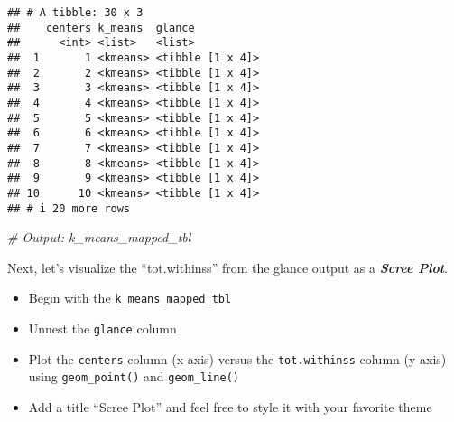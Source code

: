 \documentclass[
]{article}
\newenvironment{Shaded}{\begin{snugshade}}{\end{snugshade}}
\newcommand{\CommentTok}[1]{\textcolor[rgb]{0.56,0.35,0.01}{\textit{#1}}}
\providecommand{\tightlist}{%
  \setlength{\itemsep}{0pt}\setlength{\parskip}{0pt}}
\begin{document}
\begin{verbatim}
## # A tibble: 30 x 3
##    centers k_means  glance          
##      <int> <list>   <list>          
##  1       1 <kmeans> <tibble [1 x 4]>
##  2       2 <kmeans> <tibble [1 x 4]>
##  3       3 <kmeans> <tibble [1 x 4]>
##  4       4 <kmeans> <tibble [1 x 4]>
##  5       5 <kmeans> <tibble [1 x 4]>
##  6       6 <kmeans> <tibble [1 x 4]>
##  7       7 <kmeans> <tibble [1 x 4]>
##  8       8 <kmeans> <tibble [1 x 4]>
##  9       9 <kmeans> <tibble [1 x 4]>
## 10      10 <kmeans> <tibble [1 x 4]>
## # i 20 more rows
\end{verbatim}

\begin{Shaded}
\begin{Highlighting}[]
\CommentTok{\# Output: k\_means\_mapped\_tbl }
\end{Highlighting}
\end{Shaded}

Next, let's visualize the ``tot.withinss'' from the glance output as a
\textbf{\emph{Scree Plot}}.

\begin{itemize}
\tightlist
\item
  Begin with the \texttt{k\_means\_mapped\_tbl}
\item
  Unnest the \texttt{glance} column
\item
  Plot the \texttt{centers} column (x-axis) versus the
  \texttt{tot.withinss} column (y-axis) using \texttt{geom\_point()} and
  \texttt{geom\_line()}
\item
  Add a title ``Scree Plot'' and feel free to style it with your
  favorite theme
\end{itemize}
\end{document}
